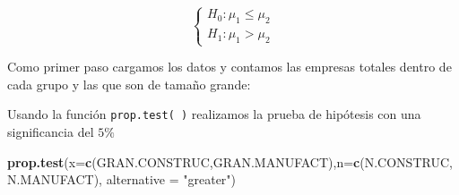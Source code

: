 \documentclass[
]{krantz}
\makeatletter
\newenvironment{Shaded}{\begin{snugshade}}{\end{snugshade}}
\newcommand{\DataTypeTok}[1]{\textcolor[rgb]{0.27,0.27,0.27}{#1}}
\newcommand{\KeywordTok}[1]{\textcolor[rgb]{0.27,0.27,0.27}{\textbf{#1}}}
\newcommand{\NormalTok}[1]{#1}
\newcommand{\OperatorTok}[1]{\textcolor[rgb]{0.43,0.43,0.43}{\textbf{#1}}}
\newcommand{\OtherTok}[1]{\textcolor[rgb]{0.37,0.37,0.37}{#1}}
\newcommand{\StringTok}[1]{\textcolor[rgb]{0.5,0.5,0.5}{#1}}
\newenvironment{kframe}{%
\medskip{}
\setlength{\fboxsep}{.8em}
 \def\at@end@of@kframe{}%
 \ifinner\ifhmode%
  \def\at@end@of@kframe{\end{minipage}}%
  \begin{minipage}{\columnwidth}%
 \fi\fi%
 \def\FrameCommand##1{\hskip\@totalleftmargin \hskip-\fboxsep
 \colorbox{shadecolor}{##1}\hskip-\fboxsep
     \hskip-\linewidth \hskip-\@totalleftmargin \hskip\columnwidth}%
 \MakeFramed {\advance\hsize-\width
   \@totalleftmargin\z@ \linewidth\hsize
   \@setminipage}}%
 {\par\unskip\endMakeFramed%
 \at@end@of@kframe}
\renewenvironment{Shaded}{\begin{kframe}}{\end{kframe}}
\makeatother
\begin{document}
\begin{equation} 
\begin{cases} 
H_0: \mu_1 \leq \mu_2 \\ 
H_1: \mu_1 > \mu_2
\end{cases} 
\end{equation}

Como primer paso cargamos los datos y contamos las empresas totales dentro de cada grupo y las que son de tamaño grande:

\begin{Shaded}
\end{Shaded}

Usando la función \texttt{prop.test(\ )} realizamos la prueba de hipótesis con una significancia del \(5\%\)

\begin{Shaded}
\begin{Highlighting}[]
\KeywordTok{prop.test}\NormalTok{(}\DataTypeTok{x=}\KeywordTok{c}\NormalTok{(GRAN.CONSTRUC,GRAN.MANUFACT),}\DataTypeTok{n=}\KeywordTok{c}\NormalTok{(N.CONSTRUC,N.MANUFACT), }
          \DataTypeTok{alternative =} \StringTok{"greater"}\NormalTok{)}
\end{Highlighting}
\end{Shaded}
\end{document}
